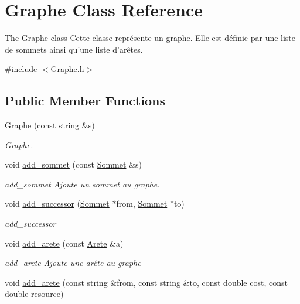 \hypertarget{class_graphe}{\section{Graphe Class Reference}
\label{class_graphe}
}


The \hyperlink{class_graphe}{Graphe} class Cette classe représente un graphe. Elle est définie par une liste de sommets ainsi qu'une liste d'arêtes.  




{\ttfamily \#include $<$Graphe.\+h$>$}

\subsection*{Public Member Functions}
\begin{DoxyCompactItemize}
\item 
\hyperlink{class_graphe_adb434f7fcd65a0da992946d699976808}{Graphe} (const string \&s)
\begin{DoxyCompactList}\small\item\em \hyperlink{class_graphe}{Graphe}. \end{DoxyCompactList}\item 
void \hyperlink{class_graphe_a99fc64177571ea73ae540fe27899e783}{add\+\_\+sommet} (const \hyperlink{class_sommet}{Sommet} \&s)
\begin{DoxyCompactList}\small\item\em add\+\_\+sommet Ajoute un sommet au graphe. \end{DoxyCompactList}\item 
void \hyperlink{class_graphe_aff29dc6bc5b4e5e028e12ac7e63571e6}{add\+\_\+successor} (\hyperlink{class_sommet}{Sommet} $\ast$from, \hyperlink{class_sommet}{Sommet} $\ast$to)
\begin{DoxyCompactList}\small\item\em add\+\_\+successor \end{DoxyCompactList}\item 
void \hyperlink{class_graphe_a4c845a9c2815cb68f3e9d075f40d5968}{add\+\_\+arete} (const \hyperlink{class_arete}{Arete} \&a)
\begin{DoxyCompactList}\small\item\em add\+\_\+arete Ajoute une arête au graphe \end{DoxyCompactList}\item 
void \hyperlink{class_graphe_a34df2e8f81e83ffde9feef6ac0bea29c}{add\+\_\+arete} (const string \&from, const string \&to, const double cost, const double resource)

\end{DoxyCompactItemize}
